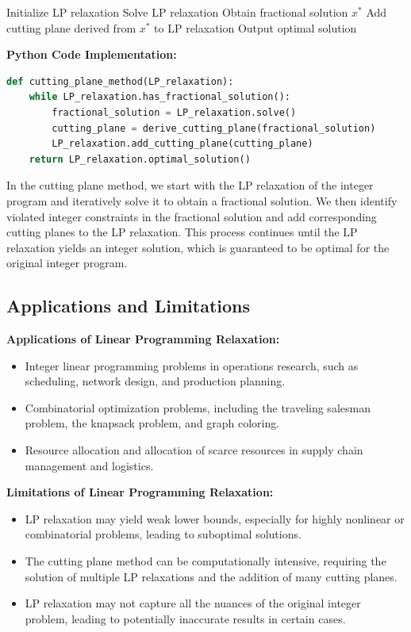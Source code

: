\documentclass[12pt]{book} %
\begin{document}
\begin{algorithm}
\caption{Cutting Plane Method}
\begin{algorithmic}[1]
\State Initialize LP relaxation
    \State Solve LP relaxation
    \State Obtain fractional solution \(x^*\)
    \State Add cutting plane derived from \(x^*\) to LP relaxation
\EndWhile
\State Output optimal solution
\end{algorithmic}
\end{algorithm}
\FloatBarrier
\textbf{Python Code Implementation:}
\FloatBarrier
\begin{lstlisting}[language=Python, caption=Python implementation of the Cutting Plane Method]
def cutting_plane_method(LP_relaxation):
    while LP_relaxation.has_fractional_solution():
        fractional_solution = LP_relaxation.solve()
        cutting_plane = derive_cutting_plane(fractional_solution)
        LP_relaxation.add_cutting_plane(cutting_plane)
    return LP_relaxation.optimal_solution()
\end{lstlisting}
\FloatBarrier

In the cutting plane method, we start with the LP relaxation of the integer program and iteratively solve it to obtain a fractional solution. We then identify violated integer constraints in the fractional solution and add corresponding cutting planes to the LP relaxation. This process continues until the LP relaxation yields an integer solution, which is guaranteed to be optimal for the original integer program.

\subsection{Applications and Limitations}

\textbf{Applications of Linear Programming Relaxation:}
\begin{itemize}
    \item Integer linear programming problems in operations research, such as scheduling, network design, and production planning.
    \item Combinatorial optimization problems, including the traveling salesman problem, the knapsack problem, and graph coloring.
    \item Resource allocation and allocation of scarce resources in supply chain management and logistics.
\end{itemize}

\textbf{Limitations of Linear Programming Relaxation:}
\begin{itemize}
    \item LP relaxation may yield weak lower bounds, especially for highly nonlinear or combinatorial problems, leading to suboptimal solutions.
    \item The cutting plane method can be computationally intensive, requiring the solution of multiple LP relaxations and the addition of many cutting planes.
    \item LP relaxation may not capture all the nuances of the original integer problem, leading to potentially inaccurate results in certain cases.
\end{itemize}
\end{document}
